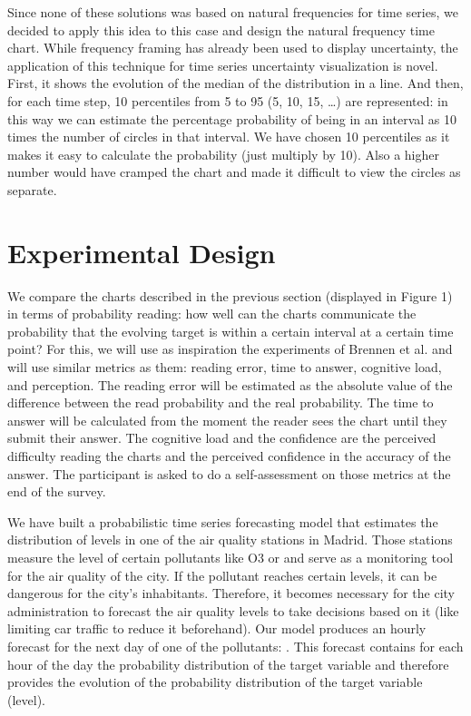 \documentclass[a4paper,3p,sort&compress]{elsarticle}
\begin{document}
Since none of these solutions was based on natural frequencies for time series,
we decided to apply this idea to this case and design the natural frequency time
chart. While frequency framing has already been used to display uncertainty, the
application of this technique for time series uncertainty visualization is
novel. First, it shows the evolution of the median of the distribution in a
line. And then, for each time step, 10 percentiles from 5 to 95
(5, 10, 15, \ldots) are represented: in this way we can estimate
the percentage probability of being in an interval as 10 times the number of
circles in that interval. We have chosen 10 percentiles as it makes it easy to
calculate the probability (just multiply by 10). Also a higher number would have
cramped the chart and made it difficult to view the circles as separate.

\section{Experimental Design}
\label{sec:exp_design}

We compare the charts described in the previous section (displayed in Figure 1)
in terms of probability
reading: how well
can the charts communicate the probability that the evolving target is within a certain interval
at a certain time point?
 For this, we will use as inspiration the experiments of Brennen et al. \cite{brennen_instrument_2018}
and will use similar metrics
as them: reading error, time to answer, cognitive load, and perception. The reading error will be estimated as the
absolute value of the difference between the read probability and the real probability. The time to answer
will be calculated from the moment the reader sees the chart until they submit their answer. The cognitive
load and the confidence are the perceived difficulty reading the charts and the perceived confidence in
the accuracy of
the answer. The participant is asked to do a self-assessment on those metrics at the end of the survey.

We have built a probabilistic time series forecasting model that estimates the distribution of \no
levels in one of the air quality stations in Madrid. Those stations measure the level of certain
pollutants like O3 or \no and serve as a monitoring tool for the air quality of the city. If the pollutant
reaches certain levels, it can be dangerous for the city's inhabitants. Therefore, it becomes necessary
for the city administration to
forecast the air quality levels to take decisions based on it (like limiting car traffic to reduce it beforehand).
Our model produces an hourly forecast for the next day of one of the pollutants: \no. This forecast contains
for each hour of the day the probability distribution of the target variable and therefore provides the evolution
of the probability distribution of the target variable (\no level).
\end{document}
